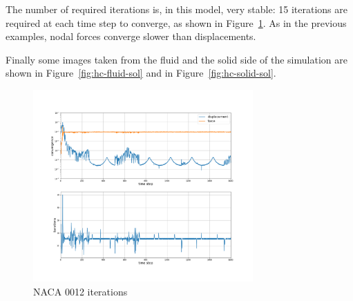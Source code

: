 The number of required iterations is, in this model, very stable: 15 iterations are required at each time step to converge, as shown in Figure~\ref{fig:hc-iterations}. As in the previous examples, nodal forces converge slower than displacements.

Finally some images taken from the fluid and the solid side of the simulation are shown in Figure~\ref{fig:hc-fluid-sol} and in Figure~\ref{fig:hc-solid-sol}.

\begin{figure}[htbp!]
	\centering
	\includegraphics[width=0.75\textwidth, trim=0 80 0 100, clip]{images/heathcote/naca0012_iterations.png}
	\caption{NACA 0012 iterations}
	\label{fig:hc-iterations}
\end{figure}

